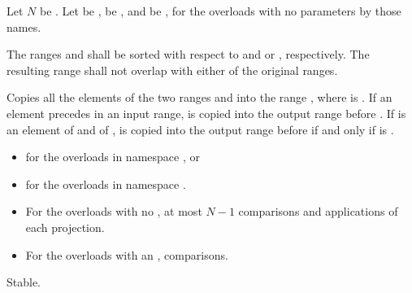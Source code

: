 \begin{itemdescr}
\pnum
Let $N$ be .
Let  be ,
 be , and
 be ,
for the overloads with no parameters by those names.

\pnum
\requires The ranges  and  shall be
sorted with respect to  and  or , respectively.
The resulting range shall not overlap with either of the original ranges.

\pnum
\effects Copies all the elements of the two ranges  and
 into the range , where 
is .
If an element  precedes  in an input range,  is
copied into the output range before . If  is an element of
 and  of ,  is
copied into the output range before  if and only if
is .

\pnum
\returns
\begin{itemize}
\item {} for the overloads in namespace , or
\item {} for the overloads in
  namespace .
\end{itemize}

\pnum
\complexity
\begin{itemize}
\item For the overloads with no , at most $N - 1$ comparisons
and applications of each projection.
\item For the overloads with an ,  comparisons.
\end{itemize}

\pnum
\remarks Stable.
\end{itemdescr}

